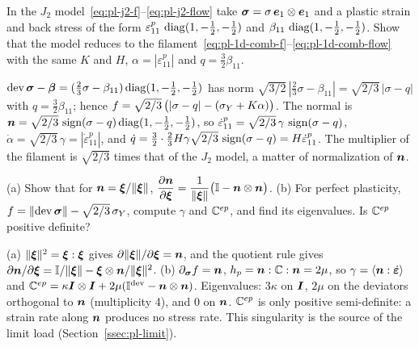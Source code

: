 
\label{exo:pl-uniaxial}
In the $J_2$ model~\eqref{eq:pl-j2-f}--\eqref{eq:pl-j2-flow} take
$\bm{\sigma}=\sigma\,\bm{e}_1\otimes\bm{e}_1$ and a plastic strain and back stress of the
form $\varepsilon^p_{11}\,\operatorname{diag}(1,-\tfrac12,-\tfrac12)$ and
$\beta_{11}\,\operatorname{diag}(1,-\tfrac12,-\tfrac12)$. Show that the model reduces to
the filament~\eqref{eq:pl-1d-comb-f}--\eqref{eq:pl-1d-comb-flow} with the
same $K$ and $H$, $\alpha=|\varepsilon^p_{11}|$ and $q=\tfrac32\beta_{11}$.
\begin{solution}
$\operatorname{dev}\bm{\sigma}-\bm{\beta}=(\tfrac23\sigma-\beta_{11})\operatorname{diag}(1,-\tfrac12,-\tfrac12)$ has
norm $\sqrt{3/2}\,|\tfrac23\sigma-\beta_{11}|=\sqrt{2/3}\,|\sigma-q|$ with
$q=\tfrac32\beta_{11}$; hence $f=\sqrt{2/3}\,\bigl(|\sigma-q|-(\sigma_{Y}+K\alpha)\bigr)$.
The normal is $\bm{n}=\sqrt{2/3}\,\operatorname{sign}(\sigma-q)\operatorname{diag}(1,-\tfrac12,-\tfrac12)$, so
$\dot\varepsilon^p_{11}=\sqrt{2/3}\,\gamma\,\operatorname{sign}(\sigma-q)$, $\dot\alpha=\sqrt{2/3}\,\gamma=|\dot\varepsilon^p_{11}|$,
and $\dot q=\tfrac32\cdot\tfrac23H\gamma\sqrt{2/3}\,\operatorname{sign}(\sigma-q)=H\dot\varepsilon^p_{11}$.
The multiplier of the filament is $\sqrt{2/3}$ times that of the $J_2$
model, a matter of normalization of $\bm{n}$.
\end{solution}

\label{exo:pl-perfect3d}
%
(a) Show that for $\bm{n}=\bm{\xi}/\lVert \bm{\xi}\rVert$,
$\displaystyle \frac{\partial\bm{n}}{\partial\bm{\xi}}=\frac{1}{\lVert \bm{\xi}\rVert}\bigl(\mathbb{I}-\bm{n}\otimes\bm{n}\bigr)$.
(b) For perfect plasticity, $f=\lVert \operatorname{dev}\bm{\sigma}\rVert-\sqrt{2/3}\,\sigma_{Y}$, compute
$\gamma$ and $\mathbb{C}^{ep}$, and find its eigenvalues. Is $\mathbb{C}^{ep}$ positive definite?
\begin{solution}
(a) $\lVert \bm{\xi}\rVert^2=\bm{\xi}:\bm{\xi}$ gives
$\partial\lVert \bm{\xi}\rVert/\partial\bm{\xi}=\bm{n}$, and the quotient rule gives
$\partial\bm{n}/\partial\bm{\xi}=\mathbb{I}/\lVert \bm{\xi}\rVert-\bm{\xi}\otimes\bm{n}/\lVert \bm{\xi}\rVert^2$.
(b) $\partial_{\bm{\sigma}}f=\bm{n}$, $h_p=\bm{n}:\mathbb{C}:\bm{n}=2\mu$, so $\gamma=\langle \bm{n}:\dot{\bm{\varepsilon}}\rangle$
and $\mathbb{C}^{ep}=\kappa\bm{I}\otimes\bm{I}+2\mu(\mathbb{I}^{\mathrm{dev}}-\bm{n}\otimes\bm{n})$. Eigenvalues:
$3\kappa$ on $\bm{I}$, $2\mu$ on the deviators orthogonal to $\bm{n}$ (multiplicity
4), and $0$ on $\bm{n}$. $\mathbb{C}^{ep}$ is only positive semi-definite: a strain rate
along $\bm{n}$ produces no stress rate. This singularity is the source of the
limit load (Section~\ref{ssec:pl-limit}).
\end{solution}

